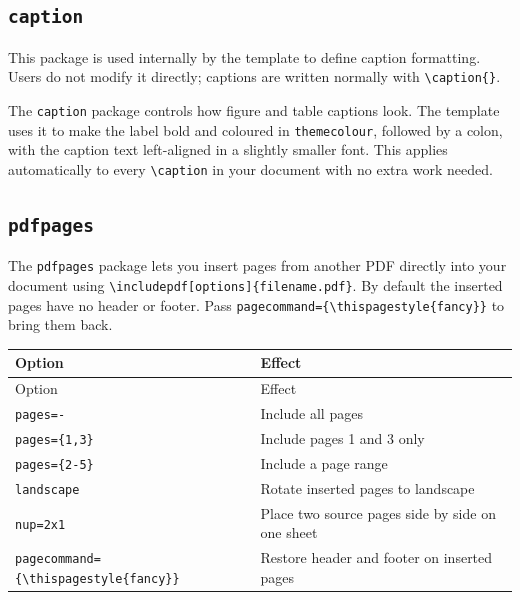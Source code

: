 	\subsection{\texttt{caption}}
	\noindent\colorbox{themecolour!15}{\parbox{\linewidth}{\small This package is used internally by the template to define caption formatting. Users do not modify it directly; captions are written normally with \texttt{\textbackslash caption\{\}}.}}\vspace{0.5\baselineskip}
	
	The \texttt{caption} package controls how figure and table captions look. The template uses it to make the label bold and coloured in \texttt{themecolour}, followed by a colon, with the caption text left-aligned in a slightly smaller font. This applies automatically to every \texttt{\textbackslash caption} in your document with no extra work needed.
	
	\subsection{\texttt{pdfpages}}
	The \texttt{pdfpages} package lets you insert pages from another PDF directly into your document using \texttt{\textbackslash includepdf[options]\{filename.pdf\}}. By default the inserted pages have no header or footer. Pass \texttt{pagecommand=\{\textbackslash thispagestyle\{fancy\}\}} to bring them back.
	
	\begin{tabularx}{\linewidth}{@{}lL@{}}
		\caption{Common \texttt{\textbackslash includepdf} options.}
		\label{tab:pdfpages} \\
		\toprule
		Option & Effect \\
		\midrule
		\endfirsthead
		\toprule
		Option & Effect \\
		\midrule
		\endhead
		\bottomrule
		\endfoot
		\bottomrule
		\endlastfoot
		\texttt{pages=-}        & Include all pages \\
		\addlinespace
		
		\texttt{pages=\{1,3\}}  & Include pages 1 and 3 only \\
		\addlinespace
		
		\texttt{pages=\{2-5\}}  & Include a page range \\
		\addlinespace
		
		\texttt{landscape}      & Rotate inserted pages to landscape \\
		\addlinespace
		
		\texttt{nup=2x1}        & Place two source pages side by side on one sheet \\
		\addlinespace
		
		\texttt{pagecommand=\{\textbackslash thispagestyle\{fancy\}\}} & Restore header and footer on inserted pages \\
	\end{tabularx}

